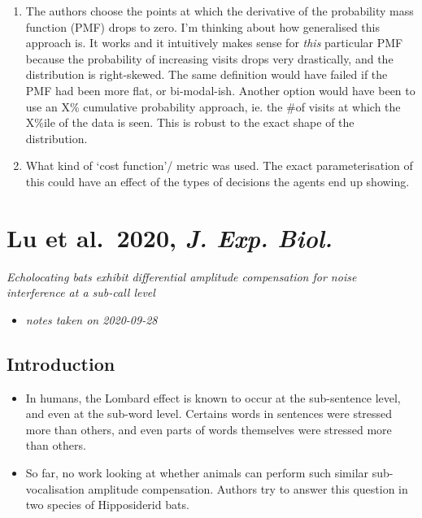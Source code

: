 \documentclass[
]{book}
\providecommand{\tightlist}{%
  \setlength{\itemsep}{0pt}\setlength{\parskip}{0pt}}
\begin{document}
\begin{enumerate}
\item
  The authors choose the points at which the derivative of the probability mass function (PMF) drops to zero. I'm thinking about how generalised this approach is. It works and it intuitively makes sense for \emph{this} particular PMF because the probability of increasing visits drops very drastically, and the distribution is right-skewed. The same definition would have failed if the PMF had been more flat, or bi-modal-ish. Another option would have been to use an X\% cumulative probability approach, ie. the \#of visits at which the X\%ile of the data is seen. This is robust to the exact shape of the distribution.
\item
  What kind of `cost function'/ metric was used. The exact parameterisation of this could have an effect of the types of decisions the agents end up showing.
\end{enumerate}

\hypertarget{lu-et-al.-2020-j.-exp.-biol.}{%
\chapter{\texorpdfstring{Lu et al.~2020, \emph{J. Exp. Biol.}}{Lu et al.~2020, J. Exp. Biol.}}\label{lu-et-al.-2020-j.-exp.-biol.}}


\emph{Echolocating bats exhibit differential amplitude compensation for noise interference at a sub-call level} \citep{lu2020echolocating}

\begin{itemize}
\tightlist
\item
  \emph{notes taken on 2020-09-28}
\end{itemize}

\hypertarget{introduction}{%
\section{Introduction}\label{introduction}}

\begin{itemize}
\tightlist
\item
  In humans, the Lombard effect is known to occur at the sub-sentence level, and even at the sub-word level. Certains words in sentences were stressed more than others, and even parts of words themselves were stressed more than others.
\item
  So far, no work looking at whether animals can perform such similar sub-vocalisation amplitude compensation. Authors try to answer this question in two species of Hipposiderid bats.
\end{itemize}
\end{document}
